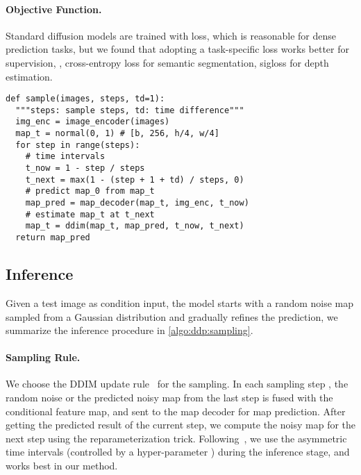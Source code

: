 \documentclass[10pt,twocolumn,letterpaper]{article}
\newcommand{\ours}[0]{DDP\xspace}
\begin{document}
\paragraph{Objective Function.}
Standard diffusion models are trained with  loss, which is reasonable for dense prediction tasks, but we found that adopting a task-specific loss works better for supervision, \eg, cross-entropy loss for semantic segmentation, sigloss for depth estimation.

\begin{algorithm}[t!]
\caption{\ours Sampling}
\label{algo:ddp:sampling}
\lstset{language=Python}
\begin{lstlisting}[xleftmargin=-1em]
def sample(images, steps, td=1):
  """steps: sample steps, td: time difference"""
  img_enc = image_encoder(images)
  map_t = normal(0, 1) # [b, 256, h/4, w/4]
  for step in range(steps):
    # time intervals
    t_now = 1 - step / steps
    t_next = max(1 - (step + 1 + td) / steps, 0)
    # predict map_0 from map_t
    map_pred = map_decoder(map_t, img_enc, t_now)
    # estimate map_t at t_next
    map_t = ddim(map_t, map_pred, t_now, t_next)
  return map_pred
\end{lstlisting}
\end{algorithm}



\subsection{Inference}
\label{sec:inference}
Given a test image as condition input, the model starts with a random noise map sampled from a Gaussian distribution and gradually refines the prediction, we summarize the inference procedure in \cref{algo:ddp:sampling}.


\paragraph{Sampling Rule.}
We choose the DDIM update rule~\cite{song2020denoising} for the sampling.
In each sampling step , the random noise  or the predicted noisy map  from the last step is fused with the conditional feature map, and sent to the map decoder  for map prediction.
After getting the predicted result of the current step, we compute the noisy map  for the next step using the reparameterization trick.
Following~\cite{chen2022analog,chen2022generalist,chen2022diffusiondet}, we use the asymmetric time intervals (controlled by a hyper-parameter ) during the inference stage, and  works best in our method.
\end{document}
